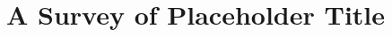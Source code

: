 \documentclass[conference]{IEEEtran}
\begin{document}
\title{A Survey of Placeholder Title}

\author{}

\maketitle

\begin{abstract}
\end{abstract}
\end{document}
